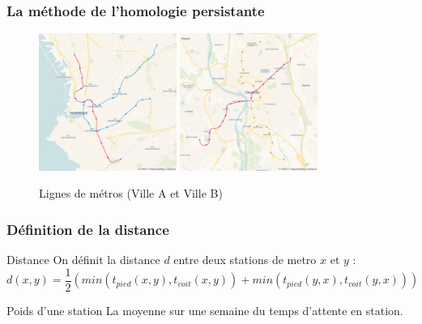 \documentclass{beamer}
\begin{document}
\begin{frame}
    \frametitle{La méthode de l'homologie persistante}

    \begin{figure}
        \includegraphics[width=0.4\textwidth]{../images/marseille_blank.png}
        \hfill
        \includegraphics[width=0.4\textwidth]{../images/toulouse_blank.png}
        \centering
        \caption{Lignes de métros (Ville A et Ville B)}
    \end{figure}

\end{frame}

\begin{frame}
    \frametitle{Définition de la distance}
    
    \begin{block}{Distance}
        On définit la distance $d$ entre deux stations de metro $x$ et $y$ : 
        $$ d(x,y) = \frac{1}{2}(min(t_{pied}(x,y), t_{voit}(x,y)) + min(t_{pied}(y,x), t_{voit}(y,x)))$$
    \end{block}

    \begin{block}{Poids d'une station}
        La moyenne sur une semaine du temps d'attente en station.
    \end{block}
\end{frame}
\end{document}
